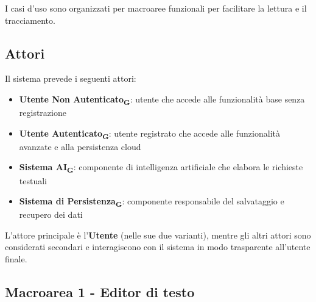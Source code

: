 \documentclass[11pt,a4paper]{article}
\begin{document}
I casi d'uso sono organizzati per macroaree funzionali per facilitare la lettura e il tracciamento.

\subsection{Attori}
Il sistema prevede i seguenti attori:

\begin{itemize}
    \item \textbf{Utente Non Autenticato\textsubscript{G}}: utente che accede alle funzionalità base senza registrazione
    \item \textbf{Utente Autenticato\textsubscript{G}}: utente registrato che accede alle funzionalità avanzate e alla persistenza cloud
    \item \textbf{Sistema AI\textsubscript{G}}: componente di intelligenza artificiale che elabora le richieste testuali
    \item \textbf{Sistema di Persistenza\textsubscript{G}}: componente responsabile del salvataggio e recupero dei dati
\end{itemize}

L'attore principale è l'\textbf{Utente} (nelle sue due varianti), mentre gli altri attori sono considerati secondari e interagiscono con il sistema in modo trasparente all'utente finale.

\newpage

\subsection{Macroarea 1 - Editor di testo}
\end{document}

